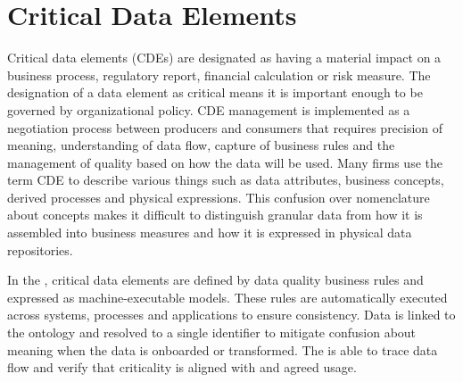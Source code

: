 \section{Critical Data Elements}\label{sec:ekgmm-b-4-5} %

Critical data elements (CDEs) are designated as having a material impact on a business process, regulatory report,
financial calculation or risk measure.
The designation of a data element as critical means it is important enough to be governed by organizational policy.
CDE management is implemented as a negotiation process between producers and consumers that requires
precision of meaning, understanding of data flow, capture of business rules and the management of quality based on
how the data will be used.
Many firms use the term CDE to describe various things such as data attributes, business concepts, derived processes
and physical expressions.
This confusion over nomenclature about concepts makes it difficult to distinguish granular data from how it is
assembled into business measures and how it is expressed in physical data repositories.

\kgmmekgrationalesection

In the ,
critical data elements are defined by data quality business rules and expressed as
machine-executable models.
These rules are automatically executed across systems, processes and applications to ensure consistency.
Data is linked to the ontology and resolved to a single identifier to mitigate confusion about meaning when the
data is onboarded or transformed.
The  is able to trace data flow and verify that criticality is aligned with 
and agreed usage.

\kgmmcorequestionssection

